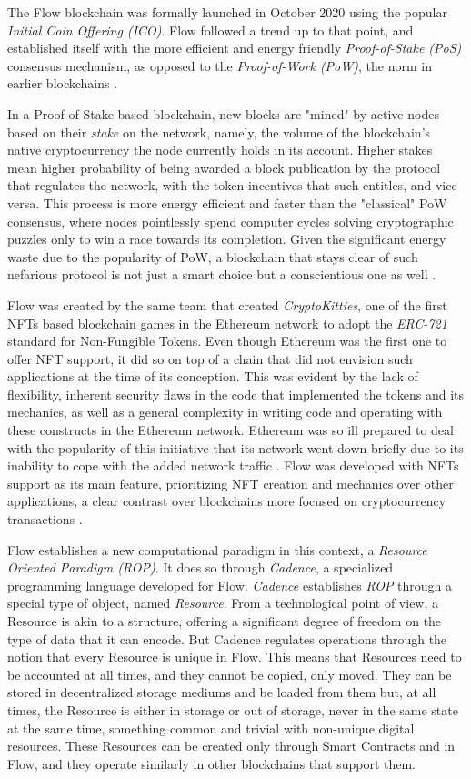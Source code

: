 The Flow blockchain was formally launched in October 2020 using the popular \textit{Initial Coin Offering (ICO)}. Flow followed a trend up to that point, and established itself with the more efficient and energy friendly \textit{Proof-of-Stake (PoS)} consensus mechanism, as opposed to the \textit{Proof-of-Work (PoW)}, the norm in earlier blockchains \cite{Hentschel2019a}.
\par
In a Proof-of-Stake based blockchain, new blocks are "mined" by active nodes based on their \textit{stake} on the network, namely, the volume of the blockchain's native cryptocurrency the node currently holds in its account. Higher stakes mean higher probability of being awarded a block publication by the protocol that regulates the network, with the token incentives that such entitles, and vice versa. This process is more energy efficient and faster than the "classical" PoW consensus, where nodes pointlessly spend computer cycles solving cryptographic puzzles only to win a race towards its completion. Given the significant energy waste due to the popularity of PoW, a blockchain that stays clear of such nefarious protocol is not just a smart choice but a conscientious one as well \cite{Hentschel2019b}.
\par
Flow was created by the same team that created \textit{CryptoKitties}, one of the first NFTs based blockchain games in the Ethereum network to adopt the \textit{ERC-721} standard for Non-Fungible Tokens. Even though Ethereum was the first one to offer NFT support, it did so on top of a chain that did not envision such applications at the time of its conception. This was evident by the lack of flexibility, inherent security flaws in the code that implemented the tokens and its mechanics, as well as a general complexity in writing code and operating with these constructs in the Ethereum network. Ethereum was so ill prepared to deal with the popularity of this initiative that its network went down briefly due to its inability to cope with the added network traffic \cite{bbc2017}. Flow was developed with NFTs support as its main feature, prioritizing NFT creation and mechanics over other applications, a clear contrast over blockchains more focused on cryptocurrency transactions \cite{Gharegozlou2019}.
\par
Flow establishes a new computational paradigm in this context, a \textit{Resource Oriented Paradigm (ROP)}. It does so through \textit{Cadence}, a specialized programming language developed for Flow. \textit{Cadence} establishes \textit{ROP} through a special type of object, named \textit{Resource}. From a technological point of view, a Resource is akin to a structure, offering a significant degree of freedom on the type of data that it can encode. But Cadence regulates operations through the notion that every Resource is unique in Flow. This means that Resources need to be accounted at all times, and they cannot be copied, only moved. They can be stored in decentralized storage mediums and be loaded from them but, at all times, the Resource is either in storage or out of storage, never in the same state at the same time, something common and trivial with non-unique digital resources. These Resources can be created only through Smart Contracts and in Flow, and they operate similarly in other blockchains that support them.
